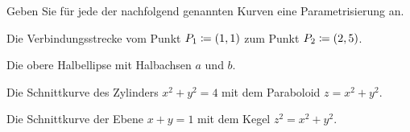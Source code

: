 \begin{atiTask}[
  title = {Kurve gegeben, Parametrisierung gesucht}
]
  Geben Sie für jede der nachfolgend genannten Kurven eine Parametrisierung an.
  \begin{atiSubtasks}
    \item{
      Die Verbindungsstrecke vom Punkt $P_1 \coloneqq (1,1)$ zum Punkt $P_2\coloneqq (2,5)$.
    }
    \item{
      Die obere Halbellipse mit Halbachsen $a$ und $b$.
    }
    \item{
      Die Schnittkurve des Zylinders $x^2 + y^2 = 4$ mit dem Paraboloid $z = x^2 + y^2$.
    }
    \item{
      Die Schnittkurve der Ebene $x+y=1$ mit dem Kegel $z^2 = x^2 + y^2$.
    }
  \end{atiSubtasks}
\end{atiTask}